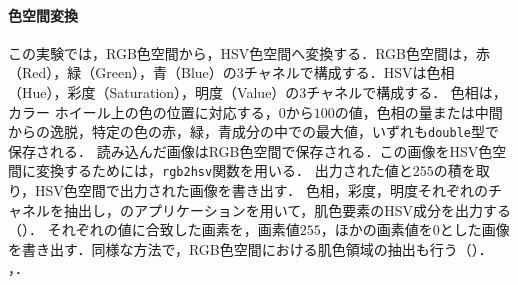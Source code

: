 \paragraph{色空間変換}
この実験では，RGB色空間から，HSV色空間へ変換する．RGB色空間は，赤（Red），緑（Green），青（Blue）の3チャネルで構成する．HSVは色相（Hue），彩度（Saturation），明度（Value）の3チャネルで構成する．
色相は，カラー ホイール上の色の位置に対応する，\(0\)から\(100\)の値，色相の量または中間からの逸脱，特定の色の赤，緑，青成分の中での最大値，いずれも\texttt{double}型で保存される\cite{rgb2hsv}．
読み込んだ画像はRGB色空間で保存される．この画像をHSV色空間に変換するためには，\texttt{rgb2hsv}関数を用いる．
出力された値と\(255\)の積を取り，HSV色空間で出力された画像を書き出す．
色相，彩度，明度それぞれのチャネルを抽出し，\matlab のアプリケーションを用いて，肌色要素のHSV成分を出力する（）．
それぞれの値に合致した画素を，画素値\(255\)，ほかの画素値を\(0\)とした画像を書き出す．同様な方法で，RGB色空間における肌色領域の抽出も行う（）．
\scall{\kadaibe}，．
